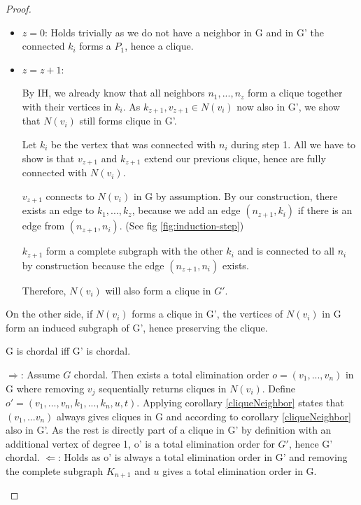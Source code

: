 \begin{proof}
\begin{subproof}
        \begin{itemize}
            \item $z = 0$: Holds trivially as we do not have a neighbor in G and in G' the connected $k_i$ forms a $P_1$, hence a clique.
            \item $z = z + 1$: 

            By IH, we already know that all neighbors $n_1,...,n_z$ form a clique together with their vertices in $k_{i}$. As $k_{z+1}, v_{z+1} \in N(v_i)$ now also in G', we show that $N(v_i)$ still forms clique in G'.

            Let $k_i$ be the vertex that was connected with $n_i$ during step 1. All we have to show is that $v_{z+1}$ and $k_{z+1}$ extend our previous clique, hence are fully connected with $N(v_i)$.
            
            $v_{z+1}$ connects to $N(v_i)$ in G by assumption. By our construction, there exists an edge to $k_1,...,k_z$, because we add an edge $(n_{z+1}, k_i)$ if there is an edge from $(n_{z+1}, n_i)$. (See fig \ref{fig:induction-step})

            $k_{z+1}$ form a complete subgraph with the other $k_i$ and is connected to all $n_i$ by construction because the edge $(n_{z+1},n_i)$ exists.  


            Therefore, $N(v_i)$ will also form a clique in $G'$.
        \end{itemize}

        On the other side, if $N(v_i)$ forms a clique in G', the vertices of $N(v_i)$ in G form an induced subgraph of G', hence preserving the clique.
        
    \end{subproof}
   
    \begin{corollary}
    G is chordal iff G' is chordal.    
    \end{corollary}
    \begin{subproof}
    $\Rightarrow$: Assume $G$ chordal. Then exists a total elimination order $o = (v_1, ..., v_n)$ in G where removing $v_j$ sequentially returns cliques in $N(v_i)$.
    Define $o' = (v_1, ..., v_n, k_1, ..., k_n, u, t)$. Applying corollary \ref*{cliqueNeighbor} states that $(v_1, ... v_n)$ always gives cliques in G and according to corollary \ref*{cliqueNeighbor} also in G'. As the rest is directly part of a clique in G' by definition with an additional vertex of degree 1, o' is a total elimination order for $G'$, hence G' chordal.
    $\Leftarrow$: Holds as o' is always a total elimination order in G' and removing the complete subgraph $K_{n+1}$ and $u$ gives a total elimination order in G.
    \end{subproof}



\end{proof}
